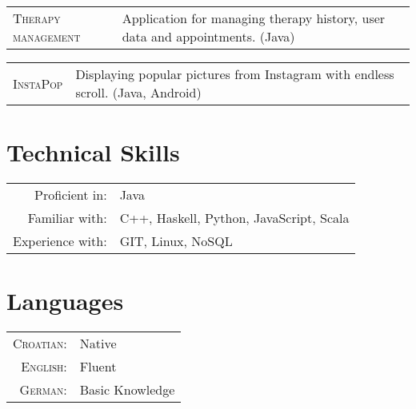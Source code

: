 \documentclass[a4paper,10pt]{article} %
\begin{document}
\begin{tabular}{l|p{11cm}}
\textsc{Therapy management} &
\footnotesize{Application for managing therapy history, user data and appointments. (Java)}\\
\end{tabular}

\begin{tabular}{l|p{11cm}}
\textsc{InstaPop} &
\footnotesize{Displaying popular pictures from Instagram with endless scroll. (Java, Android)}\\
\end{tabular}

\vspace{5mm}


\section{Technical Skills}

\begin{tabular}{rl}
    Proficient in:   &  Java \\
    Familiar with:   &  C++, Haskell, Python, JavaScript, Scala \\
    Experience with: &  GIT, Linux, NoSQL \\
\end{tabular}

\vspace{5mm}

\section{Languages}

\begin{tabular}{rl}
  \textsc{Croatian: } &  Native \\
  \textsc{English: }  &  Fluent \\
  \textsc{German: }   &  Basic Knowledge \\
\end{tabular}

\vspace{5mm}
\end{document}
